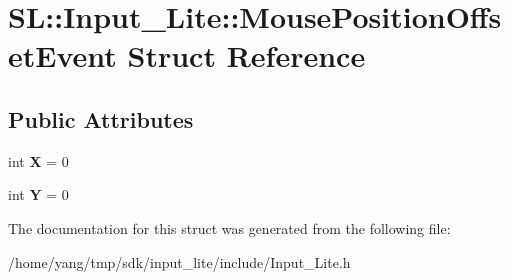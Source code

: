 \hypertarget{struct_s_l_1_1_input___lite_1_1_mouse_position_offset_event}{}\section{SL\+:\+:Input\+\_\+\+Lite\+:\+:Mouse\+Position\+Offset\+Event Struct Reference}
\label{struct_s_l_1_1_input___lite_1_1_mouse_position_offset_event}
\subsection*{Public Attributes}
\begin{DoxyCompactItemize}
\item 
int {\bfseries X} = 0\hypertarget{struct_s_l_1_1_input___lite_1_1_mouse_position_offset_event_a4253d0ea4cee2a7338c69d290dac21d3}{}\label{struct_s_l_1_1_input___lite_1_1_mouse_position_offset_event_a4253d0ea4cee2a7338c69d290dac21d3}

\item 
int {\bfseries Y} = 0\hypertarget{struct_s_l_1_1_input___lite_1_1_mouse_position_offset_event_a32f7268fd517d8b0e9b4d9e2cb7be349}{}\label{struct_s_l_1_1_input___lite_1_1_mouse_position_offset_event_a32f7268fd517d8b0e9b4d9e2cb7be349}

\end{DoxyCompactItemize}


The documentation for this struct was generated from the following file\+:\begin{DoxyCompactItemize}
\item 
/home/yang/tmp/sdk/input\+\_\+lite/include/Input\+\_\+\+Lite.\+h\end{DoxyCompactItemize}
